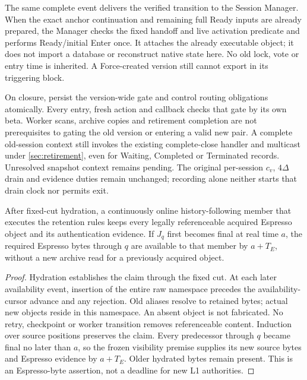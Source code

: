 The same complete event delivers the verified transition to the Session
Manager. When the exact anchor continuation and remaining full Ready
inputs are already prepared, the Manager checks the fixed handoff and
live activation predicate and performs Ready/initial Enter once. It
attaches the already executable object; it does not import a database
or reconstruct native state here. No old lock, vote or entry time is
inherited. A Force-created version still cannot export in its triggering
block.

On closure, persist the version-wide  gate and control
routing obligations atomically. Every entry, fresh action and callback
checks that gate by its own beta. Worker scans, archive copies and
retirement completion are not prerequisites to gating the old version
or entering a valid new pair. A complete old-session context still
invokes the existing complete-close handler and multicast under
\cref{sec:retirement}, even for Waiting, Completed or Terminated records.
Unresolved snapshot context remains pending. The original per-session
$c_v$, $4\Delta$ drain and evidence duties remain unchanged; recording
 alone neither starts that drain clock nor permits exit.

\begin{proposition}
\label{prop:retained-public-bytes}
After fixed-cut hydration, a continuously online history-following
member that executes the retention rules keeps every legally
referenceable acquired Espresso object and its authentication evidence.
If $J_q$ first becomes final at real time $a$, the required Espresso
bytes through $q$ are available to that member by $a+T_E$, without a
new archive read for a previously acquired object.
\end{proposition}
\begin{proof}
Hydration establishes the claim through the fixed cut. At each later
availability event, insertion of the entire raw namespace precedes the
availability-cursor advance and any rejection. Old aliases resolve to
retained bytes; actual new objects reside in this namespace. An absent
object is not fabricated. No retry, checkpoint or worker transition
removes referenceable content. Induction over source positions preserves
the claim. Every predecessor through $q$ became final no later than $a$,
so the frozen visibility premise supplies its new source bytes and
Espresso evidence by $a+T_E$. Older hydrated bytes remain present.
This is an Espresso-byte assertion, not a deadline for new L1 authorities.
\end{proof}


